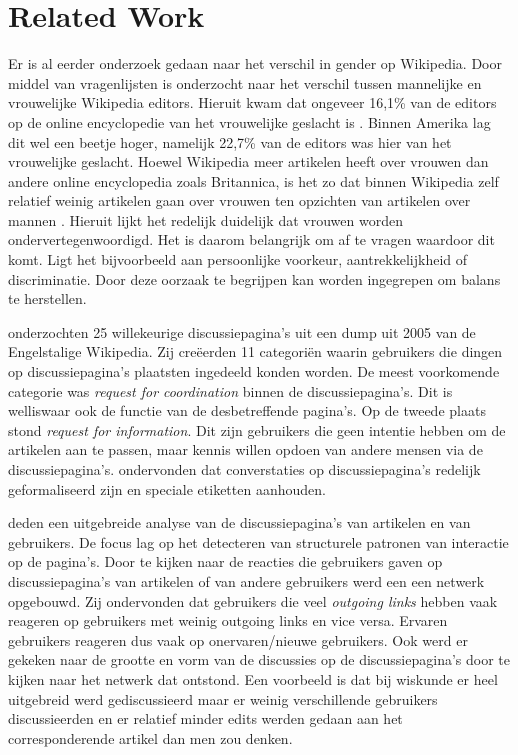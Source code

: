 \section{Related Work}
\label{sec:rel}

Er is al eerder onderzoek gedaan naar het verschil in gender op Wikipedia. Door middel van vragenlijsten is onderzocht naar het verschil tussen mannelijke en vrouwelijke Wikipedia editors. Hieruit kwam dat ongeveer 16,1\% van de editors op de online encyclopedie van het vrouwelijke geslacht is \citep{hill2013wikipedia}. Binnen Amerika lag dit wel een beetje hoger, namelijk 22,7\% van de editors was hier van het vrouwelijke geslacht. Hoewel Wikipedia meer artikelen heeft over vrouwen dan andere online encyclopedia zoals Britannica, is het zo dat binnen Wikipedia zelf relatief weinig artikelen gaan over vrouwen ten opzichten van artikelen over mannen \citep{reagle2011gender}. Hieruit lijkt het redelijk duidelijk dat vrouwen worden ondervertegenwoordigd. Het is daarom belangrijk om af te vragen waardoor dit komt. Ligt het bijvoorbeeld aan persoonlijke voorkeur, aantrekkelijkheid of discriminatie. Door deze oorzaak te begrijpen kan worden ingegrepen om balans te herstellen.

\citet{viegas2007talk} onderzochten 25 willekeurige discussiepagina's uit een dump uit 2005 van de Engelstalige Wikipedia. Zij cre\"{e}erden 11 categori\"{e}n waarin gebruikers die dingen op discussiepagina's plaatsten ingedeeld konden worden. De meest voorkomende categorie was \textit{request for coordination} binnen de discussiepagina's. Dit is welliswaar ook de functie van de desbetreffende pagina's. Op de tweede plaats stond \textit{request for information}. Dit zijn gebruikers die geen intentie hebben om de artikelen aan te passen, maar kennis willen opdoen van andere mensen via de discussiepagina's. \citet{viegas2007talk} ondervonden dat converstaties op discussiepagina's redelijk geformaliseerd zijn en speciale etiketten aanhouden.

\citet{laniado2011wikipedians} deden een uitgebreide analyse van de discussiepagina's van artikelen en van gebruikers. De focus lag op het detecteren van structurele patronen van interactie op de pagina's. Door te kijken naar de reacties die gebruikers gaven op discussiepagina's van artikelen of van andere gebruikers werd een een netwerk opgebouwd. Zij ondervonden dat gebruikers die veel \textit{outgoing links} hebben vaak reageren op gebruikers met weinig outgoing links en vice versa. Ervaren gebruikers reageren dus vaak op onervaren/nieuwe gebruikers. Ook werd er gekeken naar de grootte en vorm van de discussies op de discussiepagina's door te kijken naar het netwerk dat ontstond. Een voorbeeld is dat bij wiskunde er heel uitgebreid werd gediscussieerd maar er weinig verschillende gebruikers discussieerden en er relatief minder edits werden gedaan aan het corresponderende artikel dan men zou denken.

